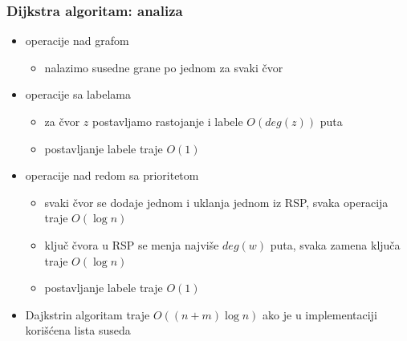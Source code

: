 \documentclass[compress,aspectratio=169]{beamer}
\begin{document}
\begin{frame}[fragile]
  \frametitle{Dijkstra algoritam: analiza}
  \begin{itemize}
    \item operacije nad grafom
    \begin{itemize}
      \item nalazimo susedne grane po jednom za svaki čvor
    \end{itemize}
    \item operacije sa labelama
    \begin{itemize}
      \item za čvor $z$ postavljamo rastojanje i labele $O(deg(z))$ puta
      \item postavljanje labele traje $O(1)$
    \end{itemize}
    \item operacije nad redom sa prioritetom
    \begin{itemize}
      \item svaki čvor se dodaje jednom i uklanja jednom iz RSP, svaka 
        operacija traje $O(\log n)$
      \item ključ čvora u RSP se menja najviše $deg(w)$ puta, svaka 
        zamena ključa traje $O(\log n)$
      \item postavljanje labele traje $O(1)$
    \end{itemize}
    \item Dajkstrin algoritam traje $O((n+m)\log n)$ ako je u 
      implementaciji korišćena lista suseda
  \end{itemize}
\end{frame}
\end{document}
